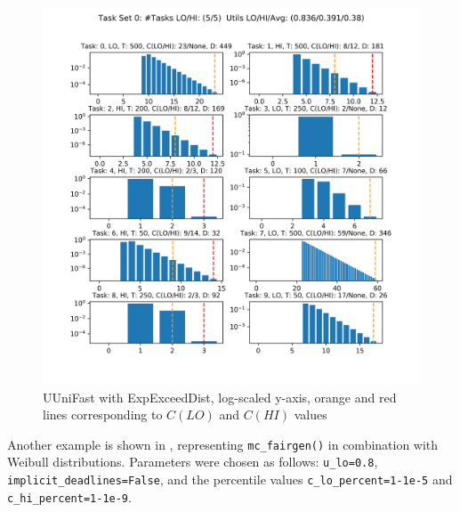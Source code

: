\documentclass[a4paper,oneside]{csthesis}
\begin{document}
\begin{figure}[p]
    \centering
    \includegraphics[width=\textwidth]{figures/ex_simplegen.png}
    \caption{UUniFast with ExpExceedDist, log-scaled y-axis, orange and red lines corresponding to $C(LO)$ and $C(HI)$ values}\label{fig:task-set-simplegen}
\end{figure}

Another example is shown in , representing \texttt{mc\_fairgen()} in combination with Weibull distributions. Parameters were chosen as follows: \texttt{u\_lo=0.8}, \texttt{implicit\_deadlines=False}, and the percentile values \texttt{c\_lo\_percent=1-1e-5} and \texttt{c\_hi\_percent=1-1e-9}.
\end{document}
